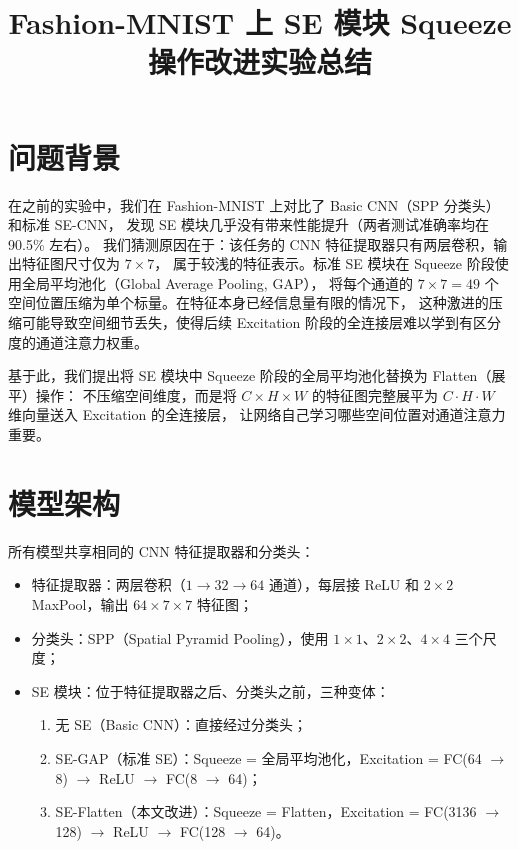 \documentclass[12pt,a4paper]{ctexart}
\title{Fashion-MNIST 上 SE 模块 Squeeze 操作改进实验总结}
\author{}
\date{}
\begin{document}
\maketitle

\section{问题背景}

在之前的实验中，我们在 Fashion-MNIST 上对比了 Basic CNN（SPP 分类头）和标准 SE-CNN，
发现 SE 模块几乎没有带来性能提升（两者测试准确率均在 90.5\% 左右）。
我们猜测原因在于：该任务的 CNN 特征提取器只有两层卷积，输出特征图尺寸仅为 $7 \times 7$，
属于较浅的特征表示。标准 SE 模块在 Squeeze 阶段使用全局平均池化（Global Average Pooling, GAP），
将每个通道的 $7 \times 7 = 49$ 个空间位置压缩为单个标量。在特征本身已经信息量有限的情况下，
这种激进的压缩可能导致空间细节丢失，使得后续 Excitation 阶段的全连接层难以学到有区分度的通道注意力权重。

基于此，我们提出将 SE 模块中 Squeeze 阶段的全局平均池化替换为 Flatten（展平）操作：
不压缩空间维度，而是将 $C \times H \times W$ 的特征图完整展平为 $C \cdot H \cdot W$ 维向量送入 Excitation 的全连接层，
让网络自己学习哪些空间位置对通道注意力重要。

\section{模型架构}

所有模型共享相同的 CNN 特征提取器和分类头：

\begin{itemize}[nosep]
    \item 特征提取器：两层卷积（$1 \to 32 \to 64$ 通道），每层接 ReLU 和 $2 \times 2$ MaxPool，输出 $64 \times 7 \times 7$ 特征图；
    \item 分类头：SPP（Spatial Pyramid Pooling），使用 $1 \times 1$、$2 \times 2$、$4 \times 4$ 三个尺度；
    \item SE 模块：位于特征提取器之后、分类头之前，三种变体：
    \begin{enumerate}[nosep]
        \item 无 SE（Basic CNN）：直接经过分类头；
        \item SE-GAP（标准 SE）：Squeeze = 全局平均池化，Excitation = FC(64 $\to$ 8) $\to$ ReLU $\to$ FC(8 $\to$ 64)；
        \item SE-Flatten（本文改进）：Squeeze = Flatten，Excitation = FC(3136 $\to$ 128) $\to$ ReLU $\to$ FC(128 $\to$ 64)。
    \end{enumerate}
\end{itemize}
\end{document}
